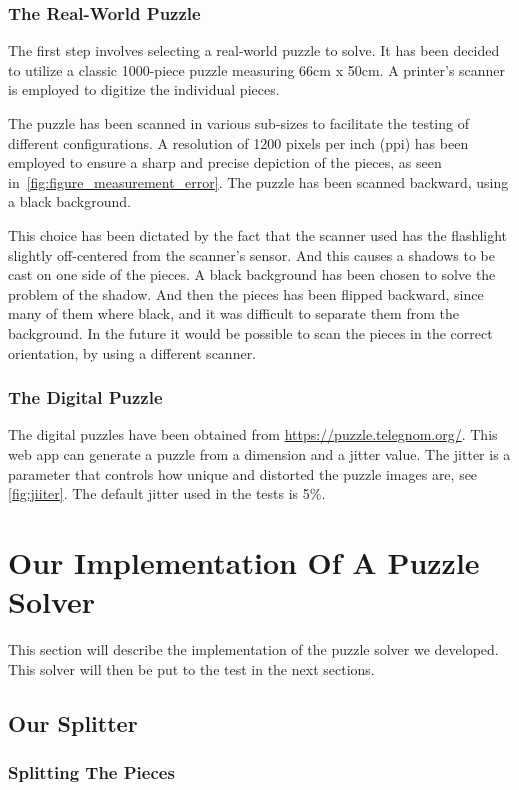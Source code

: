 \documentclass{article}
\begin{document}
\subsubsection{The Real-World Puzzle}
The first step involves selecting a real-world
puzzle to solve. It has been decided to utilize a
classic 1000-piece puzzle measuring 66cm x 50cm.
A printer's scanner is employed to digitize the individual pieces.

The puzzle has been scanned in various sub-sizes to facilitate the testing of different configurations.
A resolution of 1200 pixels per inch (ppi) has been employed to ensure a sharp and precise
depiction of the pieces, as seen in~\cref{fig:figure_measurement_error}.
The puzzle has been scanned backward, using a black background.

This choice has been dictated by the fact that the scanner used has the flashlight
slightly off-centered from the scanner's sensor.
And this causes a shadows to be cast on one side of the pieces.
A black background has been chosen to solve the problem of the shadow.
And then the pieces has been flipped backward, since many of them where black,
and it was difficult to separate them from the background.
In the future it would be possible to scan the pieces in the correct orientation,
by using a different scanner.

\subsubsection{The Digital Puzzle}
The digital puzzles have been obtained from \url{https://puzzle.telegnom.org/}.
This web app can generate a puzzle from a dimension and a jitter value. The jitter is a parameter that controls
how unique and distorted the puzzle images are, see \cref{fig:jiiter}.
The default jitter used in the tests is 5\%.

\section{Our Implementation Of A Puzzle Solver}

This section will describe the implementation of the puzzle solver we developed.
This solver will then be put to the test in the next sections.

\subsection{Our Splitter}

\subsubsection{Splitting The Pieces}
\end{document}
